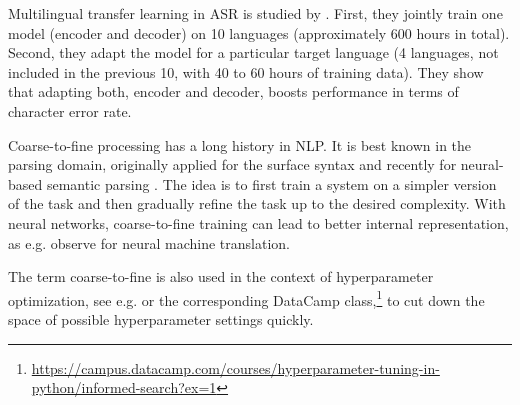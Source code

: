 
Multilingual transfer learning in ASR is studied by . First, they jointly train one model (encoder and decoder) on 10 languages (approximately 600 hours in total). Second, they adapt the model %
for a particular target language (4 languages, not included in the previous 10, with 40 to 60 hours of training data). They show that adapting both, encoder and decoder, boosts performance in terms of character error rate.

Coarse-to-fine processing  has a long history in NLP. It is best known in the parsing domain, originally applied for the surface syntax  and recently for neural-based semantic parsing . The idea is to first train a system on a simpler version of the task and then gradually refine the task up to the desired complexity. With neural networks, coarse-to-fine training can lead to better internal representation, as e.g.  observe for neural machine translation.

The term coarse-to-fine is also used in the context of hyperparameter optimization, see e.g.  or the corresponding DataCamp class,\footnote{\url{https://campus.datacamp.com/courses/hyperparameter-tuning-in-python/informed-search?ex=1}} to cut down the space of possible hyperparameter settings quickly.




